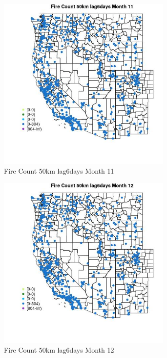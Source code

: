 \begin{figure} 
\centering  
\includegraphics[width=0.77\textwidth]{Code_Outputs/Report_ML_input_PM25_Step4_part_f_de_duplicated_aves_prioritize_24hr_obswNAs_MapObsMo11Fire_Count_50km_lag6days.jpg} 
\caption{\label{fig:Report_ML_input_PM25_Step4_part_f_de_duplicated_aves_prioritize_24hr_obswNAsMapObsMo11Fire_Count_50km_lag6days}Fire Count 50km lag6days Month 11} 
\end{figure} 
 

\begin{figure} 
\centering  
\includegraphics[width=0.77\textwidth]{Code_Outputs/Report_ML_input_PM25_Step4_part_f_de_duplicated_aves_prioritize_24hr_obswNAs_MapObsMo12Fire_Count_50km_lag6days.jpg} 
\caption{\label{fig:Report_ML_input_PM25_Step4_part_f_de_duplicated_aves_prioritize_24hr_obswNAsMapObsMo12Fire_Count_50km_lag6days}Fire Count 50km lag6days Month 12} 
\end{figure} 
 


